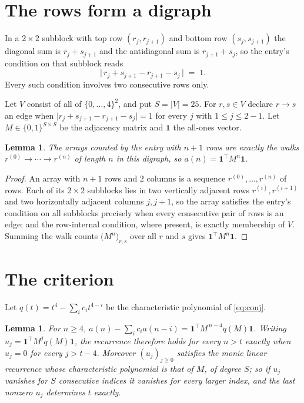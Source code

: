 \documentclass[11pt,a4paper]{article}
\theoremstyle{plain}
\newtheorem{lemma}[theorem]{Lemma}
\theoremstyle{definition}
\begin{document}
\section{The rows form a digraph}

In a $2\times2$ subblock with top row $(r_j,r_{j+1})$ and bottom row $(s_j,s_{j+1})$ the
diagonal sum is $r_j+s_{j+1}$ and the antidiagonal sum is $r_{j+1}+s_j$, so the entry's
condition on that subblock reads
\[
\bigl|\,r_j+s_{j+1}-r_{j+1}-s_j\,\bigr|\;=\;1.
\]
Every such condition involves two consecutive rows only.

Let $V$ consist of all of $\{0,\dots,4\}^{2}$, and put $S=|V|=25$. For $r,s\in V$ declare $r\to s$ an edge
when $\bigl|r_j+s_{j+1}-r_{j+1}-s_j\bigr|=1$ for every $j$ with
$1\le j\le2-1$. Let $M\in\{0,1\}^{S\times S}$ be the adjacency matrix and $\mathbf{1}$
the all-ones vector.

\begin{lemma}\label{lem:walk}
The arrays counted by the entry with $n+1$ rows are exactly the walks
$r^{(0)}\to\cdots\to r^{(n)}$ of length $n$ in this digraph, so
$a(n)=\mathbf{1}^{\!\top}M^{n}\mathbf{1}$.
\end{lemma}

\begin{proof}
An array with $n+1$ rows and $2$ columns is a sequence $r^{(0)},\dots,r^{(n)}$ of
rows. Each of its $2\times2$ subblocks lies in two vertically adjacent rows
$r^{(i)},r^{(i+1)}$ and two horizontally adjacent columns $j,j+1$, so the array satisfies
the entry's condition on all subblocks precisely when every consecutive pair of rows is an
edge; and the row-internal condition, where present, is exactly membership of $V$. Summing
the walk counts $\bigl(M^{n}\bigr)_{r,s}$ over all $r$ and $s$ gives
$\mathbf{1}^{\!\top}M^{n}\mathbf{1}$.
\end{proof}

\section{The criterion}

Let $q(t)=t^{4}-\sum_i c_i t^{4-i}$ be the characteristic polynomial of
\eqref{eq:conj}.

\begin{lemma}\label{lem:crit}
For $n\ge4$,
$a(n)-\sum_i c_i a(n-i)=\mathbf{1}^{\!\top}M^{\,n-4}q(M)\mathbf{1}$. Writing
$u_j=\mathbf{1}^{\!\top}M^{j}q(M)\mathbf{1}$, the recurrence therefore holds for every
$n>t$ exactly when $u_j=0$ for every $j>t-4$. Moreover $(u_j)_{j\ge0}$ satisfies the
monic linear recurrence whose characteristic polynomial is that of $M$, of degree $S$; so
if $u_j$ vanishes for $S$ consecutive indices it vanishes for every larger index, and the
last nonzero $u_j$ determines $t$ exactly.
\end{lemma}
\end{document}
